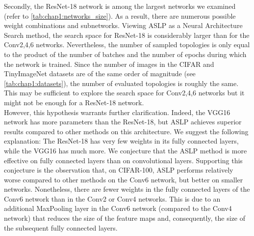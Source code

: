 Secondly, the ResNet-18 network is among the largest networks we examined (refer
to \cref{tab:chap1:networks_size}). As a result, there are numerous possible
weight combinations and subnetworks. Viewing \ac{ASLP} as a Neural Architecture
Search method, the search space for ResNet-18 is considerably larger than for
the Conv{2,4,6} networks. Nevertheless, the number of sampled topologies is only
equal to the product of the number of batches and the number of epochs during
which the network is trained. Since the number of images in the CIFAR and
TinyImageNet datasets are of the same order of magnitude (see
\cref{tab:chap1:datasets}), the number of evaluated topologies is roughly the
same. This may be sufficient to explore the search space for Conv{2,4,6}
networks but it might not be enough for a ResNet-18 network.\\


However, this hypothesis warrants further clarification. Indeed, the VGG16
network has more parameters than the ResNet-18, but \ac{ASLP} achieves superior
results compared to other methods on this architecture. We suggest the following
explanation: The ResNet-18 has very few weights in its fully connected layers,
while the VGG16 has much more. We conjecture that the \ac{ASLP} method is more
effective on fully connected layers than on convolutional layers. Supporting
this conjecture is the observation that, on CIFAR-100, \ac{ASLP} performs
relatively worse compared to other methods on the Conv6 network, but better on
smaller networks. Nonetheless, there are fewer weights in the fully connected
layers of the Conv6 network than in the Conv2 or Conv4 networks. This is due to
an additional MaxPooling layer in the Conv6 network (compared to the Conv4
network) that reduces the size of the feature maps and, consequently, the size
of the subsequent fully connected layers.\\






